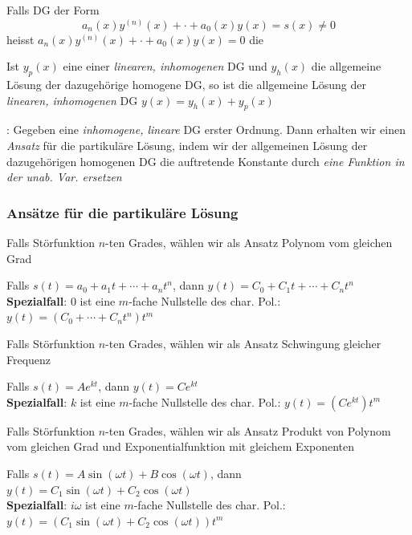 \Def Falls DG der Form
$$a_n(x)y^{(n)}(x) + \cdot + a_0(x)y(x) = s(x) \ne 0$$
heisst $a_n(x)y^{(n)}(x) + \cdot + a_0(x)y(x) = 0$ die 

\Satz Ist $y_p(x)$ eine  einer \textit{linearen, inhomogenen} DG und
$y_h(x)$ die allgemeine Lösung der dazugehörige homogene DG, so ist die allgemeine Lösung der
\textit{linearen, inhomogenen} DG $y(x) = y_h(x) + y_p(x)$

\Satz {}: Gegeben eine \textit{inhomogene, lineare} DG erster Ordnung.
Dann erhalten wir einen \textit{Ansatz} für die partikuläre Lösung, indem wir der allgemeinen
Lösung der dazugehörigen homogenen DG die auftretende Konstante durch
\textit{eine Funktion in der unab. Var. ersetzen}

\subsubsection{Ansätze für die partikuläre Lösung}

Falls Störfunktion  $n$-ten Grades, wählen wir als Ansatz Polynom vom gleichen Grad

\Satz Falls $s(t) = a_0 + a_1 t + \cdots + a_nt^n$, dann $y(t) = C_0 + C_1 t + \cdots + C_nt^n$ \\
\textbf{Spezialfall}: $0$ ist eine $m$-fache Nullstelle des char. Pol.: $y(t) = (C_0 + \cdots + C_nt^n)t^m$

Falls Störfunktion  $n$-ten Grades, wählen wir als Ansatz Schwingung gleicher Frequenz

\Satz Falls $s(t) = A e^{kt}$, dann $y(t) = C e^{kt}$ \\
\textbf{Spezialfall}: $k$ ist eine $m$-fache Nullstelle des char. Pol.: $y(t) = (C e^{kt})t^m$

Falls Störfunktion  $n$-ten Grades, wählen wir als
Ansatz Produkt von Polynom vom gleichen Grad und Exponentialfunktion mit gleichem Exponenten

\Satz Falls $s(t) = A \sin(\omega t) + B \cos(\omega t)$, dann $y(t) = C_1 \sin(\omega t) + C_2 \cos(\omega t)$ \\
\textbf{Spezialfall}: $i\omega$ ist eine $m$-fache Nullstelle des char. Pol.: $y(t) = (C_1 \sin(\omega t) + C_2 \cos(\omega t))t^m$
